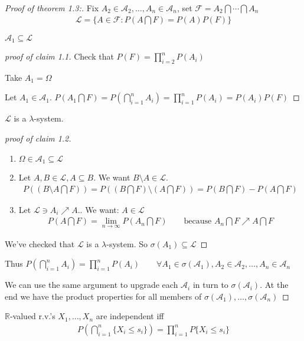 \documentclass[11pt]{article}
\begin{document}
\begin{proof}[Proof of theorem 1.3:]
    Fix $A_2 \in \mathcal{A}_{2}, \ldots ,A_n \in \mathcal{A}_{n}$, set 
    $\mathcal{F} = A_2 \bigcap \cdots \bigcap A_n$
    \begin{align*}
        \mathcal{L} = \{ A \in \mathcal{F}: P(A \bigcap F) = P(A)P(F) \}
    \end{align*}
    \begin{claim}
        $\mathcal{A}_1 \subseteq \mathcal{L}$
        \begin{proof}[proof of claim 1.1]
            Check that $P(F) = \prod_{i=2}^{n}P(A_{i}) $

            Take $A_1 = \Omega$

            Let $A_1 \in \mathcal{A}_{1}$. $P(A_{1} \bigcap F) = P(\bigcap_{i=1}^{n}A_{i})
            = \prod_{i=1}^{n}P(A_{i}) = P(A_{i})P(F) $
        \end{proof}
    \end{claim}
    \begin{claim}
        $\mathcal{L}$ is a $\lambda$-system.
        \begin{proof}[proof of claim 1.2]
            \begin{enumerate}
                \item $\Omega \in \mathcal{A}_{1} \subseteq \mathcal{L}$
                \item Let $A,B \in \mathcal{L}, A \subseteq B$. We want $B\setminus A \in \mathcal{L}$.
                \begin{align*}
                    P((B\setminus A \bigcap F)) = P((B \bigcap F)\setminus(A \bigcap F))
                    = P(B \bigcap F) - P(A \bigcap F)
                \end{align*}
                \item Let $\mathcal{L} \ni A_{i} \nearrow A.$. We want: $A \in \mathcal{L}$
                \begin{align*}
                    P(A\bigcap F) = \lim_{n \to \infty}P(A_n \bigcap F) \qquad \text{because }
                    A_n \bigcap F \nearrow A\bigcap F
                \end{align*}
            \end{enumerate}
            We've checked that $\mathcal{L}$ is a $\lambda$-system. So $\sigma(A_1) \subseteq \mathcal{L}$

        \end{proof}
    \end{claim}
    Thus $P(\bigcap _{i=1}^{n} A_i) = \prod_{i=1}^{n} P(A_{i}) \qquad \forall 
     A_1 \in \sigma(\mathcal{A}_1), A_2 \in \mathcal{A}_{2}, \ldots ,A_n \in \mathcal{A}_{n}$

     We can use the same argument to upgrade each $\mathcal{A}_i$ in turn to $\sigma(\mathcal{A}_{i})$.
     At the end we have the product properties for all members of $\sigma(\mathcal{A}_{1}), \ldots ,
     \sigma(\mathcal{A}_{n})$
\end{proof}

\begin{corollary}
    $\mathbb{R}$-valued r.v.'s $X_1, \ldots ,X_n$ are independent iff 
    \begin{align*}
        P(\bigcap _{i=1}^{n}\{ X_{i} \le s_i \}) = \prod_{i=1}^{n}P\{ X_{i} \le s_i \} 
    \end{align*}
\end{corollary}
\end{document}
